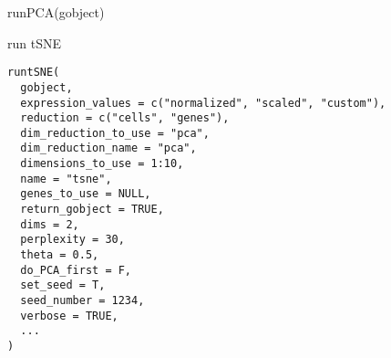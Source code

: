 \documentclass[a4paper]{book}
\begin{document}
%
\begin{Examples}
\begin{ExampleCode}
    runPCA(gobject)
\end{ExampleCode}
\end{Examples}
%
\begin{Description}\relax
run tSNE
\end{Description}
%
\begin{Usage}
\begin{verbatim}
runtSNE(
  gobject,
  expression_values = c("normalized", "scaled", "custom"),
  reduction = c("cells", "genes"),
  dim_reduction_to_use = "pca",
  dim_reduction_name = "pca",
  dimensions_to_use = 1:10,
  name = "tsne",
  genes_to_use = NULL,
  return_gobject = TRUE,
  dims = 2,
  perplexity = 30,
  theta = 0.5,
  do_PCA_first = F,
  set_seed = T,
  seed_number = 1234,
  verbose = TRUE,
  ...
)
\end{verbatim}
\end{Usage}
%
\end{document}
